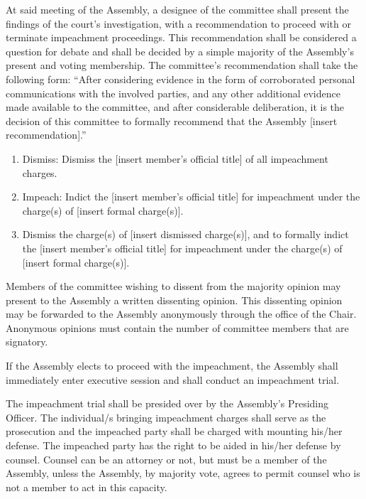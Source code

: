 \begin{bylaws-number}
  \begin{bylaws-number}
    \item At said meeting of the Assembly, a designee of the committee shall present the findings of the court’s investigation, with a recommendation to proceed with or terminate impeachment proceedings. This recommendation shall be considered a question for debate and shall be decided by a simple majority of the Assembly’s present and voting membership. The committee’s recommendation shall take the following form:
“After considering evidence in the form of corroborated personal communications with the involved parties, and any other additional evidence made available to the committee, and after considerable deliberation, it is the decision of this committee to formally recommend that the Assembly [insert recommendation].”
    \begin{enumerate}[i]
      \item Dismiss: Dismiss the [insert member’s official title] of all impeachment charges.
      \item Impeach: Indict the [insert member’s official title] for impeachment under the charge(s) of [insert formal charge(s)].
      \item Dismiss the charge(s) of [insert dismissed charge(s)], and to formally indict the [insert member’s official title] for impeachment under the charge(s) of [insert formal charge(s)].
    \end{enumerate}
    \item Members of the committee wishing to dissent from the majority opinion may present to the Assembly a written dissenting opinion. This dissenting opinion may be forwarded to the Assembly anonymously through the office of the Chair. Anonymous opinions must contain the number of committee members that are signatory.
    \item If the Assembly elects to proceed with the impeachment, the Assembly shall immediately enter executive session and shall conduct an impeachment trial.
    \item The impeachment trial shall be presided over by the Assembly’s Presiding Officer. The individual/s bringing impeachment charges shall serve as the prosecution and the impeached party shall be charged with mounting his/her defense. The impeached party has the right to be aided in his/her defense by counsel. Counsel can be an attorney or not, but must be a member of the Assembly, unless the Assembly, by majority vote, agrees to permit counsel who is not a member to act in this capacity.

\end{bylaws-number}
\end{bylaws-number}
